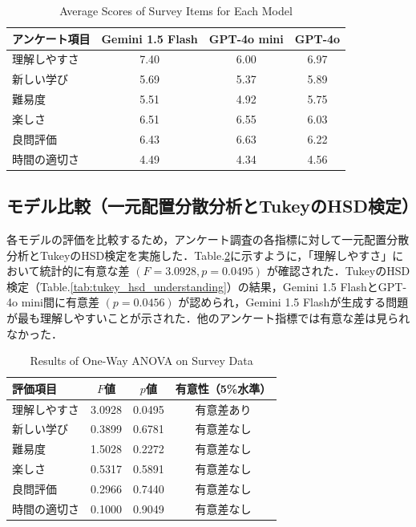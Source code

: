 \documentclass[twocolumn, fleqn, uplatex]{jsarticle}
\begin{document}
\begin{table}[t]
\centering
\footnotesize
\caption{Average Scores of Survey Items for Each Model}
\label{tab:mean_values}
\begin{tabular}{lccc}
\toprule
    アンケート項目 & Gemini 1.5 Flash & GPT-4o mini & GPT-4o \\
    \midrule
    理解しやすさ & 7.40 & 6.00 & 6.97 \\
    新しい学び & 5.69 & 5.37 & 5.89 \\
    難易度 & 5.51 & 4.92 & 5.75 \\
    楽しさ & 6.51 & 6.55 & 6.03 \\
    良問評価 & 6.43 & 6.63 & 6.22 \\
    時間の適切さ & 4.49 & 4.34 & 4.56 \\
\bottomrule
\end{tabular}
\end{table}

\subsection{モデル比較（一元配置分散分析とTukeyのHSD検定）}

各モデルの評価を比較するため，アンケート調査の各指標に対して一元配置分散分析とTukeyのHSD検定を実施した．Table.\ref{tab:anova_results}に示すように，「理解しやすさ」において統計的に有意な差 $(F=3.0928, p=0.0495)$ が確認された．TukeyのHSD検定（Table.\ref{tab:tukey_hsd_understanding}）の結果，Gemini 1.5 FlashとGPT-4o mini間に有意差 $(p=0.0456)$ が認められ，Gemini 1.5 Flashが生成する問題が最も理解しやすいことが示された．他のアンケート指標では有意な差は見られなかった．

\begin{table}[t]
\centering
\footnotesize
\caption{Results of One-Way ANOVA on Survey Data}
\label{tab:anova_results}
\begin{tabular}{lccc}
\hline
評価項目 & $F$値 & $p$値 & 有意性（5\%水準） \\
\hline
理解しやすさ & 3.0928 & 0.0495 & 有意差あり \\
新しい学び & 0.3899 & 0.6781 & 有意差なし \\
難易度 & 1.5028 & 0.2272 & 有意差なし \\
楽しさ & 0.5317 & 0.5891 & 有意差なし \\
良問評価 & 0.2966 & 0.7440 & 有意差なし \\
時間の適切さ & 0.1000 & 0.9049 & 有意差なし \\
\hline
\end{tabular}
\end{table}
\end{document}
